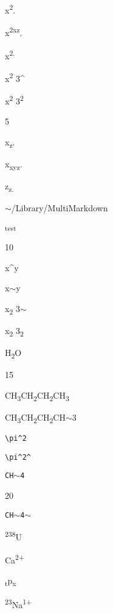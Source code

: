 
\def\mytitle{Superscript}


x\textsuperscript{2}.

x\textsuperscript{2xz}.

x\textsuperscript{2.}

x\textsuperscript{2} 3\^{}

x\textsuperscript{2} 3\textsuperscript{2}

5

x\textsubscript{z}.

x\textsubscript{xyz}.

z\textsubscript{z.}

\ensuremath{\sim}\slash Library\slash MultiMarkdown

\textsuperscript{test}

10

x\^{}y

x\ensuremath{\sim}y

x\textsubscript{2} 3\ensuremath{\sim}

x\textsubscript{2} 3\textsubscript{2}

H\textsubscript{2}O

15

CH\textsubscript{3}CH\textsubscript{2}CH\textsubscript{2}CH\textsubscript{3}

CH\textsubscript{3}CH\textsubscript{2}CH\textsubscript{2}CH\ensuremath{\sim}3

\texttt{\textbackslash{}pi\^{}2}

\texttt{\textbackslash{}pi\^{}2\^{}}

\texttt{CH\ensuremath{\sim}4}

20

\texttt{CH\ensuremath{\sim}4\ensuremath{\sim}}

\textsuperscript{238}U

Ca\textsuperscript{2+}

\textsubscript{t}p\textsubscript{x}

\textsuperscript{23}Na\textsuperscript{1+}



